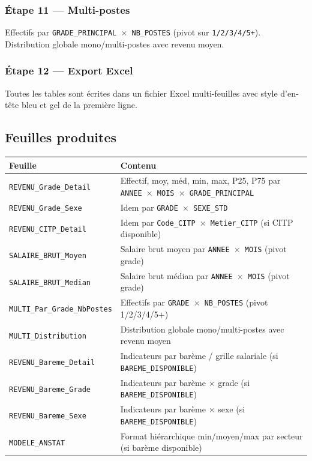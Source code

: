 \documentclass[12pt,a4paper,french]{report}
\begin{document}
\subsubsection{Étape 11 — Multi-postes}

Effectifs par \texttt{GRADE\_PRINCIPAL $\times$ NB\_POSTES} (pivot sur
\texttt{1/2/3/4/5+}). Distribution globale mono/multi-postes avec revenu moyen.

\subsubsection{Étape 12 — Export Excel}

Toutes les tables sont écrites dans un fichier Excel multi-feuilles avec
style d'en-tête bleu et gel de la première ligne.

\subsection{Feuilles produites}

\begin{longtable}{lX}
  \toprule
  \textbf{Feuille} & \textbf{Contenu} \\
  \midrule
  \endhead
  \texttt{REVENU\_Grade\_Detail} &
    Effectif, moy, méd, min, max, P25, P75 par
    \texttt{ANNEE $\times$ MOIS $\times$ GRADE\_PRINCIPAL} \\
  \texttt{REVENU\_Grade\_Sexe} &
    Idem par \texttt{GRADE $\times$ SEXE\_STD} \\
  \texttt{REVENU\_CITP\_Detail} &
    Idem par \texttt{Code\_CITP $\times$ Metier\_CITP}
    (si CITP disponible) \\
  \texttt{SALAIRE\_BRUT\_Moyen} &
    Salaire brut moyen par \texttt{ANNEE $\times$ MOIS} (pivot grade) \\
  \texttt{SALAIRE\_BRUT\_Median} &
    Salaire brut médian par \texttt{ANNEE $\times$ MOIS} (pivot grade) \\
  \texttt{MULTI\_Par\_Grade\_NbPostes} &
    Effectifs par \texttt{GRADE $\times$ NB\_POSTES}
    (pivot 1/2/3/4/5+) \\
  \texttt{MULTI\_Distribution} &
    Distribution globale mono/multi-postes avec revenu moyen \\
  \texttt{REVENU\_Bareme\_Detail} &
    Indicateurs par barème / grille salariale
    (si \texttt{BAREME\_DISPONIBLE}) \\
  \texttt{REVENU\_Bareme\_Grade} &
    Indicateurs par barème $\times$ grade
    (si \texttt{BAREME\_DISPONIBLE}) \\
  \texttt{REVENU\_Bareme\_Sexe} &
    Indicateurs par barème $\times$ sexe
    (si \texttt{BAREME\_DISPONIBLE}) \\
  \texttt{MODELE\_ANSTAT} &
    Format hiérarchique min/moyen/max par secteur (si barème disponible) \\
  \bottomrule
\end{longtable}
\end{document}
